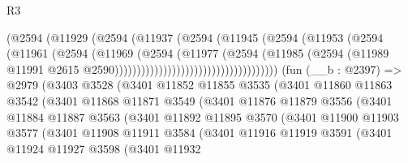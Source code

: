 \begin{lexlean}{R3}
\begin{coremodule}
                                          (@2594
                                            (@11929
                                              (@2594
                                                (@11937
                                                  (@2594
                                                    (@11945
                                                      (@2594
                                                        (@11953
                                                          (@2594
                                                            (@11961
                                                              (@2594
                                                                (@11969
                                                                  (@2594
                                                                    (@11977
                                                                      (@2594
                                                                        (@11985
                                                                          (@2594
                                                                            (@11989
                                                                              @11991
                                                                              @2615
                                                                              @2590)))))))))))))))))))))))))))))))))))))
    (fun (__b : @2397) =>
    @2979
      (@3403
        @3528
        (@3401
          @11852
          @11855
          @3535
          (@3401
            @11860
            @11863
            @3542
            (@3401
              @11868
              @11871
              @3549
              (@3401
                @11876
                @11879
                @3556
                (@3401
                  @11884
                  @11887
                  @3563
                  (@3401
                    @11892
                    @11895
                    @3570
                    (@3401
                      @11900
                      @11903
                      @3577
                      (@3401
                        @11908
                        @11911
                        @3584
                        (@3401
                          @11916
                          @11919
                          @3591
                          (@3401
                            @11924
                            @11927
                            @3598
                            (@3401
                              @11932

\end{coremodule}
\end{lexlean}
